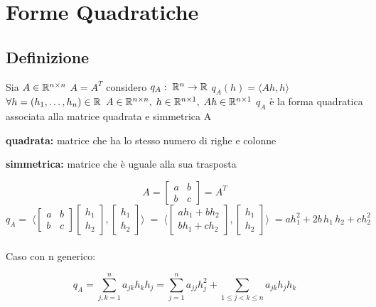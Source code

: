 \documentclass[12pt]{article}
\begin{document}
\section{Forme Quadratiche}

\subsection{Definizione}

Sia $A\in \mathbb{R} ^ {n\times n}$ $A=A^T$ considero $q_A:\; \mathbb{R}^n \rightarrow \mathbb{R} $ $q_A(h) = \langle Ah, h\rangle$\newline
$\forall h = (h_1,\dots, h_n)\in \mathbb{R}$ \qquad $A\in \mathbb{R}^{n\times n},\;h\in \mathbb{R}^{n\times 1},\; Ah\in \mathbb{R}^{n\times 1}$\newline
$q_A$ è la forma quadratica associata alla matrice quadrata e simmetrica A

\textbf{quadrata:} matrice che ha lo stesso numero di righe e colonne

\textbf{simmetrica:} matrice che è uguale alla sua trasposta


$$
    A =
    \begin{bmatrix}
        a & b \\
        b & c
    \end{bmatrix}
    = A^T
$$
$$
    q_A = \;\langle
    \begin{bmatrix}
        a & b \\
        b & c
    \end{bmatrix}
    \begin{bmatrix}
        h_1 \\
        h_2
    \end{bmatrix},
    \begin{bmatrix}
        h_1 \\
        h_2
    \end{bmatrix}
    \rangle\; = \;\langle
    \begin{bmatrix}
        ah_1 + bh_2 \\
        bh_1 + ch_2
    \end{bmatrix},
    \begin{bmatrix}
        h_1 \\
        h_2
    \end{bmatrix}
    \rangle\; = ah_1^2+2b\,h_1\,h_2+ch_2^2
$$
\\Caso con n generico:

$$
    q_A = \sum_{j,k = 1}^{n} a_{jk} h_k h_j = \sum_{j = 1}^{n} a_{jj} h_j^2 + \sum_{1\leq j < k\leq n} a_{jk}h_jh_k
$$
\end{document}
